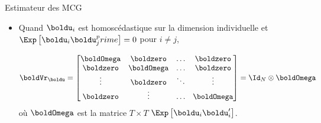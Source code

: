 \begin{frame}[allowframebreaks]{Estimateur des MCG}
\begin{itemize}
    \item  Quand $\boldu_i$ est homoscédastique 
    sur la dimension individuelle et $\Exp\left[\boldu_i\boldu_j^prime\right] = 0$ pour $i \neq j$,
 
    \begin{align*}
    \boldVr_{\boldu} = 
    \begin{bmatrix}
    \boldOmega&\boldzero&\ldots &\boldzero\\
    \boldzero&\boldOmega&\ldots&\boldzero\\
    \vdots&\boldzero&\ddots&\vdots\\
    \boldzero&\vdots&\ldots&\boldOmega
    \end{bmatrix}
   = \Id_N\otimes\boldOmega
   \end{align*}
   où $\boldOmega$ est la matrice $T\times T$ $\Exp\left[\boldu_i\boldu_i^\prime\right]$.
\end{itemize}
\end{frame}

